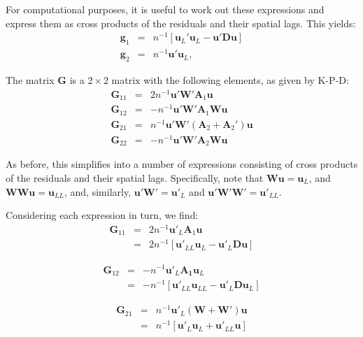 \documentclass{article}
\begin{document}
For computational purposes, it is useful to work out these
expressions and express them as cross products of the residuals and their
spatial lags. This yields:
\begin{eqnarray*}
 \mathbf{g}_1 &=& n^{-1} [ \mathbf{u}_L' \mathbf{u}_L - \mathbf{u}' \mathbf{D} \mathbf{u} ]\\
  \mathbf{g}_2 &=& n^{-1} \mathbf{u}' \mathbf{u}_L,
\end{eqnarray*}

The matrix $\mathbf{G}$ is a $2 \times 2$ matrix with the following elements,
as given by K-P-D:
\begin{eqnarray}
\mathbf{G}_{11} &=& 2n^{-1} \mathbf{u}' \mathbf{W'} \mathbf{A}_1 \mathbf{u} \label{eq:g11}\\
\mathbf{G}_{12} &=& - n^{-1} \mathbf{u}' \mathbf{W'} \mathbf{A}_1 \mathbf{W} \mathbf{u} \label{eq:g12}\\
\mathbf{G}_{21} &=& n^{-1} \mathbf{u}' \mathbf{W'} ( \mathbf{A}_2 + \mathbf{A}_2 ' ) \mathbf{u} \label{eq:g21} \\
\mathbf{G}_{22} &=& - n^{-1} \mathbf{u}' \mathbf{W'} \mathbf{A}_2 \mathbf{W} \mathbf{u} \label{eq:g22}
\end{eqnarray}

As before, this simplifies into a number of expressions consisting of cross products
of the residuals and their spatial lags. Specifically, note that $\mathbf{Wu} = \mathbf{u}_L$,
and $\mathbf{WWu} = \mathbf{u}_{LL}$, and, similarly, $\mathbf{u'W'} = \mathbf{u'}_L$
and $\mathbf{u'W'W'} = \mathbf{u'}_{LL}$.

Considering each expression in turn, we find:
\begin{eqnarray}
\mathbf{G}_{11} &=& 2 n^{-1} \mathbf{u'}_L \mathbf{A}_1 \mathbf{u}\label{eq:G11}\\
    &=& 2 n^{-1} [ \mathbf{u'}_{LL} \mathbf{u}_L - \mathbf{u'}_L \mathbf{D} \mathbf{u} ]\nonumber
\end{eqnarray}

\begin{eqnarray}
\mathbf{G}_{12} &=& - n^{-1} \mathbf{u'}_L \mathbf{A_1} \mathbf{u}_L\label{eq:G12}\\
   &=& - n^{-1} [ \mathbf{u'}_{LL} \mathbf{u}_{LL} - \mathbf{u'}_L \mathbf{D} \mathbf{u}_L ]\nonumber
\end{eqnarray}

\begin{eqnarray}
 \mathbf{G}_{21} &=& n^{-1} \mathbf{u'}_L (\mathbf{W} + \mathbf{W'}) \mathbf{u} \label{eq:G21}\\
   &=& n^{-1} [ \mathbf{u'}_L \mathbf{u}_L + \mathbf{u'}_{LL} \mathbf{u} ]\nonumber
\end{eqnarray}
\end{document}
